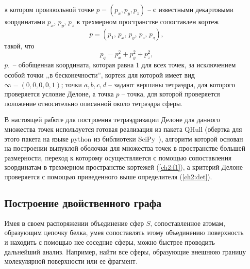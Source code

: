 в котором произвольной точке $p=(p_x, p_y, p_z)$ -- с известными декартовыми координатами $p_x$, $p_y$, $p_z$ в трехмерном пространстве сопоставлен кортеж 
\begin{equation}
p=(p_1,\,p_x,\, p_y,\, p_z,\,p_q), \label{ch2:f1}
\end{equation}
такой, что
$$
p_q=p_x^2+p_y^2+p_z^2,
$$ 
$p_1$ -- обобщенная координата, которая равна $1$ для всех точек, за исключением особой точки ,,в бесконечности'', кортеж для которой имеет вид ${\infty=(0,0,0,0,1)}$; точки $a, b, c, d$ -- задают вершины тетраэдра, для которого проверяется условие Делоне, а точка $p$ -- точка, для которой проверяется положение относительно описанной около тетраэдра сферы. 

В настоящей работе для построения тетраэдризации Делоне для данного множества точек используется готовая реализация из пакета QHull \cite{qhull} (обертка для этого пакета на языке  python из библиотеки SciPy~\cite{scipy}), алгоритм которой основан на построении выпуклой оболочки для множества точек в пространстве большей размерности, переход к которому осуществляется с помощью сопоставления координатам в трехмерном пространстве  кортежей (\ref{ch2:f1}), а критерий Делоне проверяется с помощью приведенного выше определителя (\ref{ch2:det}). 



\subsection{Построение двойственного графа}
Имея в своем распоряжении объединение сфер $S$, сопоставленное атомам, образующим цепочку белка, умея сопоставлять этому объединению поверхность и находить с помощью нее соседние сферы, можно быстрее проводить дальнейший анализ. Например, найти все сферы, образующие внешнюю границу молекулярной поверхности или ее фрагмент.

